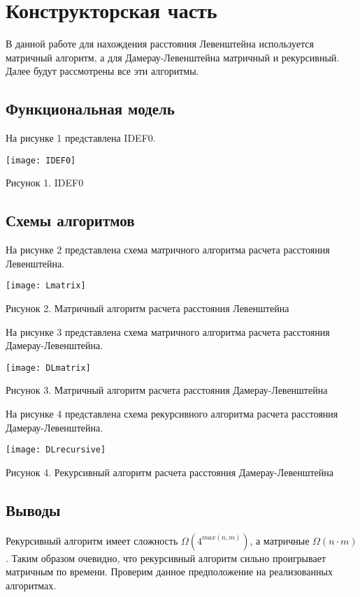 \newpage
\section{Конструкторская часть}

В данной работе для нахождения расстояния Левенштейна используется матричный
алгоритм, а для Дамерау-Левенштейна матричный и рекурсивный. Далее будут
рассмотрены все эти алгоритмы.

\subsection{Функциональная модель}

На рисунке 1 представлена IDEF0.

\begin{center}
    \texttt{[image: IDEF0]}

    Рисунок 1. IDEF0
\end{center}

\subsection{Схемы алгоритмов}

На рисунке 2 представлена схема матричного алгоритма расчета расстояния Левенштейна.

\begin{center}
    \texttt{[image: Lmatrix]}

    Рисунок 2. Матричный алгоритм расчета расстояния Левенштейна
\end{center}

На рисунке 3 представлена схема матричного алгоритма расчета расстояния Дамерау-Левенштейна.

\begin{center}
    \texttt{[image: DLmatrix]}

    Рисунок 3. Матричный алгоритм расчета расстояния Дамерау-Левенштейна
\end{center}

На рисунке 4 представлена схема рекурсивного алгоритма расчета расстояния Дамерау-Левенштейна.

\begin{center}
    \texttt{[image: DLrecursive]}

    Рисунок 4. Рекурсивный алгоритм расчета расстояния Дамерау-Левенштейна
\end{center}

\subsection{Выводы}

Рекурсивный алгоритм имеет сложность $\Omega (4^{max(n,m)})$, а матричные
$\Omega (n \cdot m)$. Таким образом очевидно, что рекурсивный алгоритм
сильно проигрывает матричным по времени. Проверим данное предположение
на реализованных алгоритмах.
